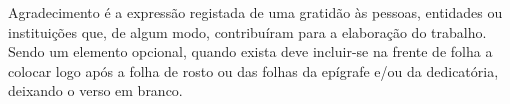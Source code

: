 
\begin{acknowledgements}

Agradecimento é a expressão registada de uma gratidão às pessoas, entidades ou instituições que, de algum modo, contribuíram para a elaboração do trabalho. Sendo um elemento opcional, quando exista deve incluir-se na frente de folha a colocar logo após a folha de rosto ou das folhas da epígrafe e/ou da dedicatória, deixando o verso em branco.

\end{acknowledgements}





